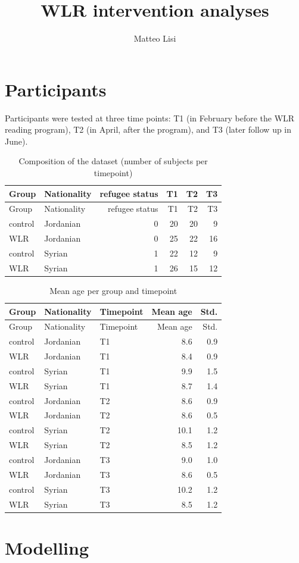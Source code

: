 \documentclass[]{article}
\title{WLR intervention analyses}
\author{Matteo Lisi}
\date{}
\begin{document}
\maketitle

{
\setcounter{tocdepth}{4}
\tableofcontents
}
\newpage

\hypertarget{participants}{%
\section{Participants}\label{participants}}

Participants were tested at three time points: T1 (in February before
the WLR reading program), T2 (in April, after the program), and T3
(later follow up in June).

\begin{longtable}[]{@{}llrrrr@{}}
\caption{Composition of the dataset (number of subjects per
timepoint)}\tabularnewline
\toprule
Group & Nationality & refugee status & T1 & T2 & T3\tabularnewline
\midrule
\endfirsthead
\toprule
Group & Nationality & refugee status & T1 & T2 & T3\tabularnewline
\midrule
\endhead
control & Jordanian & 0 & 20 & 20 & 9\tabularnewline
WLR & Jordanian & 0 & 25 & 22 & 16\tabularnewline
control & Syrian & 1 & 22 & 12 & 9\tabularnewline
WLR & Syrian & 1 & 26 & 15 & 12\tabularnewline
\bottomrule
\end{longtable}

\begin{longtable}[]{@{}lllrr@{}}
\caption{Mean age per group and timepoint}\tabularnewline
\toprule
Group & Nationality & Timepoint & Mean age & Std.\tabularnewline
\midrule
\endfirsthead
\toprule
Group & Nationality & Timepoint & Mean age & Std.\tabularnewline
\midrule
\endhead
control & Jordanian & T1 & 8.6 & 0.9\tabularnewline
WLR & Jordanian & T1 & 8.4 & 0.9\tabularnewline
control & Syrian & T1 & 9.9 & 1.5\tabularnewline
WLR & Syrian & T1 & 8.7 & 1.4\tabularnewline
control & Jordanian & T2 & 8.6 & 0.9\tabularnewline
WLR & Jordanian & T2 & 8.6 & 0.5\tabularnewline
control & Syrian & T2 & 10.1 & 1.2\tabularnewline
WLR & Syrian & T2 & 8.5 & 1.2\tabularnewline
control & Jordanian & T3 & 9.0 & 1.0\tabularnewline
WLR & Jordanian & T3 & 8.6 & 0.5\tabularnewline
control & Syrian & T3 & 10.2 & 1.2\tabularnewline
WLR & Syrian & T3 & 8.5 & 1.2\tabularnewline
\bottomrule
\end{longtable}

\newpage

\hypertarget{modelling}{%
\section{Modelling}\label{modelling}}
\end{document}
